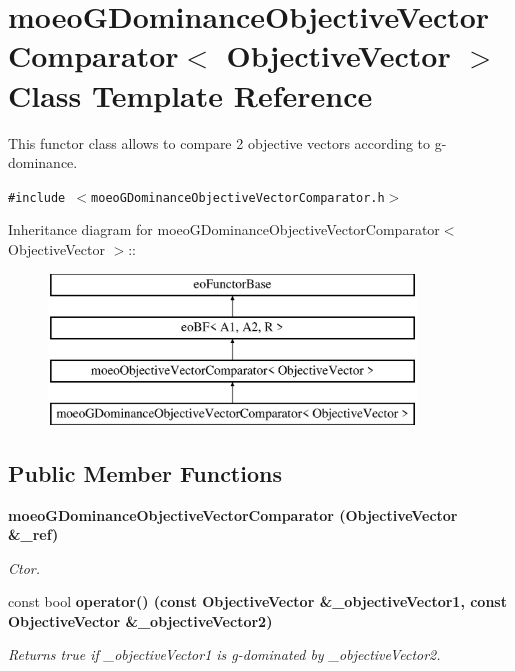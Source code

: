 \section{moeo\-GDominance\-Objective\-Vector\-Comparator$<$ Objective\-Vector $>$ Class Template Reference}
\label{classmoeoGDominanceObjectiveVectorComparator}
This functor class allows to compare 2 objective vectors according to g-dominance.  


{\tt \#include $<$moeo\-GDominance\-Objective\-Vector\-Comparator.h$>$}

Inheritance diagram for moeo\-GDominance\-Objective\-Vector\-Comparator$<$ Objective\-Vector $>$::\begin{figure}[H]
\begin{center}
\leavevmode
\includegraphics[height=4cm]{classmoeoGDominanceObjectiveVectorComparator}
\end{center}
\end{figure}
\subsection*{Public Member Functions}
\begin{CompactItemize}
\item 
\bf{moeo\-GDominance\-Objective\-Vector\-Comparator} (\bf{Objective\-Vector} \&\_\-ref)
\begin{CompactList}\small\item\em Ctor. \item\end{CompactList}\item 
const bool \bf{operator()} (const \bf{Objective\-Vector} \&\_\-objective\-Vector1, const \bf{Objective\-Vector} \&\_\-objective\-Vector2)
\begin{CompactList}\small\item\em Returns true if \_\-objective\-Vector1 is g-dominated by \_\-objective\-Vector2. \item\end{CompactList}\end{CompactItemize}
